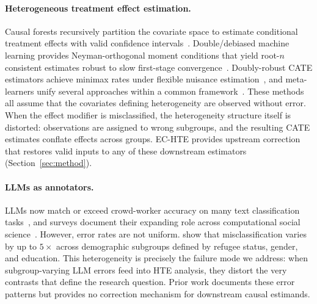 \paragraph{Heterogeneous treatment effect estimation.}
Causal forests recursively partition the covariate space to estimate conditional treatment effects with valid confidence intervals~\cite{athey2016recursive,wager2018causal}.
Double/debiased machine learning provides Neyman-orthogonal moment conditions that yield root-$n$ consistent estimates robust to slow first-stage convergence~\cite{chernozhukov2018dml}.
Doubly-robust CATE estimators achieve minimax rates under flexible nuisance estimation~\cite{kennedy2023dr}, and meta-learners unify several approaches within a common framework~\cite{kunzel2019metalearners}.
These methods all assume that the covariates defining heterogeneity are observed without error.
When the effect modifier is misclassified, the heterogeneity structure itself is distorted: observations are assigned to wrong subgroups, and the resulting CATE estimates conflate effects across groups.
EC-HTE provides upstream correction that restores valid inputs to any of these downstream estimators (Section~\ref{sec:method}).

\paragraph{LLMs as annotators.}
LLMs now match or exceed crowd-worker accuracy on many text classification tasks~\cite{gilardi2023chatgpt,tornberg2024chatgpt}, and surveys document their expanding role across computational social science~\cite{ziems2024nlp,pangakis2023automated}.
However, error rates are not uniform.
\citet{ashwin2025bias} show that misclassification varies by up to $5\times$ across demographic subgroups defined by refugee status, gender, and education.
This heterogeneity is precisely the failure mode we address: when subgroup-varying LLM errors feed into HTE analysis, they distort the very contrasts that define the research question.
Prior work documents these error patterns but provides no correction mechanism for downstream causal estimands.

